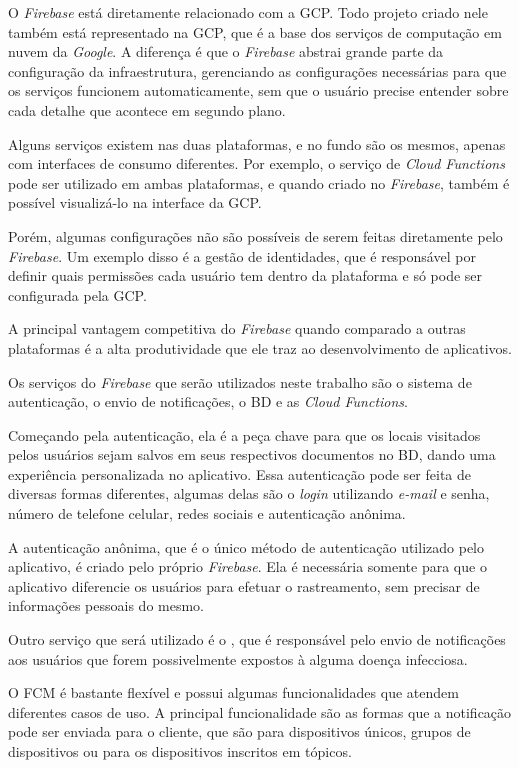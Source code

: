 O \textit{Firebase} está diretamente relacionado com a GCP. Todo projeto criado nele também está representado na GCP, que é a base dos serviços de computação em nuvem da \textit{Google}. A diferença é que o \textit{Firebase} abstrai grande parte da configuração da infraestrutura, gerenciando as configurações necessárias para que os serviços funcionem automaticamente, sem que o usuário precise entender sobre cada detalhe que acontece em segundo plano.

Alguns serviços existem nas duas plataformas, e no fundo são os mesmos, apenas com interfaces de consumo diferentes. Por exemplo, o serviço de \textit{Cloud Functions} pode ser utilizado em ambas plataformas, e quando criado no \textit{Firebase}, também é possível visualizá-lo na interface da GCP.

Porém, algumas configurações não são possíveis de serem feitas diretamente pelo \textit{Firebase}. Um exemplo disso é a gestão de identidades, que é responsável por definir quais permissões cada usuário tem dentro da plataforma e só pode ser configurada pela GCP.

A principal vantagem competitiva do \textit{Firebase} quando comparado a outras plataformas é a alta produtividade que ele traz ao desenvolvimento de aplicativos.

Os serviços do \textit{Firebase} que serão utilizados neste trabalho são o sistema de autenticação, o envio de notificações, o BD e as \textit{Cloud Functions}.

Começando pela autenticação, ela é a peça chave para que os locais visitados pelos usuários sejam salvos em seus respectivos documentos no BD, dando uma experiência personalizada no aplicativo. Essa autenticação pode ser feita de diversas formas diferentes, algumas delas são o \textit{login} utilizando \textit{e-mail} e senha, número de telefone celular, redes sociais e autenticação anônima.

A autenticação anônima, que é o único método de autenticação utilizado pelo aplicativo, é criado pelo próprio \textit{Firebase}. Ela é necessária somente para que o aplicativo diferencie os usuários para efetuar o rastreamento, sem precisar de informações pessoais do mesmo.

Outro serviço que será utilizado é o , que é responsável pelo envio de notificações aos usuários que forem possivelmente expostos à alguma doença infecciosa.

O FCM é bastante flexível e possui algumas funcionalidades que atendem diferentes casos de uso. A principal funcionalidade são as formas que a notificação pode ser enviada para o cliente, que são para dispositivos únicos, grupos de dispositivos ou para os dispositivos inscritos em tópicos. 

